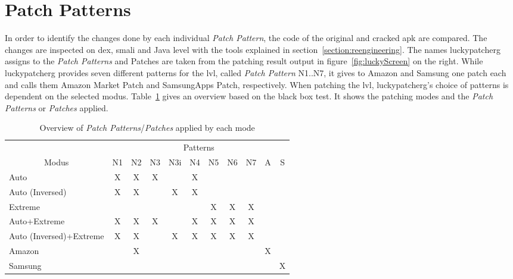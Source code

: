 \section{Patch Patterns} \label{section:luckypatcher-patterns}
In order to identify the changes done by each individual \textit{Patch Pattern}, the code of the original and cracked \gls{apk} are compared.
The changes are inspected on dex, smali and Java level with the tools explained in section~\ref{section:reengineering}.
\newline
The names \gls{luckypatcherg} assigns to the \textit{Patch Patterns} and Patches are taken from the patching result output in figure~\ref{fig:luckyScreen} on the right.
While \gls{luckypatcherg} provides seven different patterns for the \gls{lvl}, called \textit{Patch Pattern} N1..N7, it gives to Amazon and Samsung one patch each and calls them Amazon Market Patch and SamsungApps Patch, respectively.
\newline
When patching the \gls{lvl}, \gls{luckypatcherg}'s choice of patterns is dependent on the selected modus.
Table~\ref{table:patterns} gives an overview based on the black box test.
It shows the patching modes and the \textit{Patch Patterns} or \textit{Patches} applied.
\newline
\begin{table}[h]
\centering
\begin{tabular}{l|cccccccccc}
                           & \multicolumn{10}{c}{Patterns}           \\
\multicolumn{1}{c|}{Modus} & N1 & N2 & N3 & N3i & N4 & N5 & N6 & N7 & A & S \\ \hline
Auto                       & X  & X  & X  &     & X  &    &    &  &&  \\
Auto (Inversed)            & X  & X  &    & X   & X  &    &    &  &&  \\
Extreme                    &    &    &    &     &    & X  & X  & X && \\
Auto+Extreme               & X  & X  & X  &     & X  & X  & X  & X && \\
Auto (Inversed)+Extreme    & X  & X  &    & X   & X  & X  & X  &X &&\\
Amazon               &   &  X&   &     &   &   &   &  &X&\\
Samsung               &   &   &   &     &   &   &   &   &&X
\end{tabular}
\caption{Overview of \textit{Patch Patterns}/\textit{Patches} applied by each mode}
\label{table:patterns}
\end{table}
